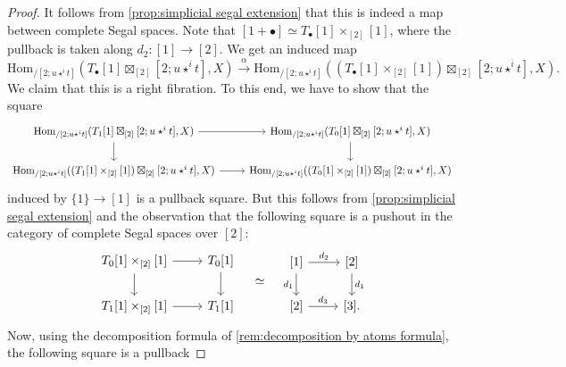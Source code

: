 \documentclass[10pt,a4paper]{amsart}
\newcommand{\Hom}{\mathrm{Hom}}
\begin{document}
\begin{proof}
 It follows from \cref{prop:simplicial segal extension} that this is indeed a map between complete Segal spaces.
Note that $[1+\bullet] \simeq T_\bullet[1] \times_{[2]} [1]$, where the pullback is taken along $d_2 \colon [1] \to [2]$.
We get an induced map 
$$\Hom_{/[2;u\star^i t]}(T_\bullet[1]\boxtimes_{[2]}[2;u\star^i t],X)\xrightarrow{\alpha} \Hom_{/[2;u\star^i t]}((T_\bullet[1] \times_{[2]} [1])\boxtimes_{[2]}[2;u\star^i t],X).$$
We claim that this is a right fibration.
To this end, we have to show that the square 
\[\begin{tikzcd}
	\Hom_{/[2;u\star^i t]}({T_1[1]\boxtimes_{[2]}[2;u\star^it]}, X)& \Hom_{/[2;u\star^i t]}({T_0[1]\boxtimes_{[2]}[2;u\star^it]},X)\\
	\Hom_{/[2;u\star^i t]}({(T_1[1]\times_{[2]}[1])\boxtimes_{[2]}[2;u\star^it]},X) & \Hom_{/[2;u\star^i t]}({(T_0[1]\times_{[2]}[1])\boxtimes_{[2]}[2;u\star^it]} , X)
	\arrow[from=1-1, to=1-2]
	\arrow[from=1-1, to=2-1]
	\arrow[from=1-2, to=2-2]
	\arrow[from=2-1, to=2-2]
\end{tikzcd}\]
induced by $\{1\} \to [1]$ is a pullback square.
But this follows from \cref{prop:simplicial segal extension} and the observation that the following square is a pushout in the category of complete Segal spaces over $[2]$:%
\[\begin{tikzcd}
	 {T_0[1]\times_{[2]}[1]} & {T_0[1]} \\
	{T_1[1]\times_{[2]}[1]} & {T_1[1]}
	\arrow[from=1-1, to=1-2]
	\arrow[from=1-1, to=2-1]
	\arrow[from=1-2, to=2-2]
	\arrow[from=2-1, to=2-2]
\end{tikzcd}
\quad \simeq \quad
\begin{tikzcd}
	{[1]} & {[2]} \\
	{[2]} & {[3]}.
	\arrow[from=1-1, to=1-2, "d_2"]
	\arrow[from=1-1, to=2-1, "d_1"']
	\arrow[from=1-2, to=2-2, "d_1"]
	\arrow[from=2-1, to=2-2, "d_3"]
\end{tikzcd}
\]
Now, using the decomposition formula of \cref{rem:decomposition by atoms formula}, the following square is a pullback

\end{proof}
\end{document}

